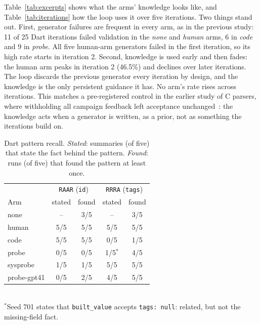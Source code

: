 Table~\ref{tab:excerpts} shows what the arms' knowledge looks like, and
Table~\ref{tab:iterations} how the loop uses it over five iterations. Two
things stand out. First, generator failures are frequent in every arm, as in
the previous study: 11 of 25 Dart iterations failed validation in the
\emph{none} and \emph{human} arms, 6 in \emph{code} and 9 in
\emph{probe}. All five human-arm generators failed in the first iteration,
so its high rate starts in iteration 2. Second, knowledge is used early and
then fades: the human arm peaks in iteration 2 (46.5\%) and declines over later
iterations. The loop discards the
previous generator every iteration by design, and the knowledge is the only
persistent guidance it has. No arm's rate rises across iterations. This matches a
pre-registered control in the earlier study of C parsers, where withholding
all campaign feedback left acceptance unchanged~\grammarcite{}: the
knowledge acts when a generator is written, as a prior, not as something
the iterations build on.

\begin{table}[t]
\centering
\caption{Dart pattern recall. \emph{Stated}: summaries (of five) that state
the fact behind the pattern. \emph{Found}: runs (of five) that found the
pattern at least once.}
\label{tab:recall}
\begin{tabular}{lcccc}
\toprule
& \multicolumn{2}{c}{\texttt{RAAR} (\texttt{id})} & \multicolumn{2}{c}{\texttt{RRRA} (\texttt{tags})} \\
Arm & stated & found & stated & found \\
\midrule
none  & --   & 3/5 & --   & 3/5 \\
human & 5/5  & 5/5 & 5/5  & 5/5 \\
code  & 5/5  & 5/5 & 0/5  & 1/5 \\
probe & 0/5  & 0/5 & 1/5$^{*}$ & 4/5 \\
\midrule
sysprobe    & 1/5 & 1/5 & 5/5 & 5/5 \\
probe-gpt41 & 0/5 & 2/5 & 4/5 & 5/5 \\
\bottomrule
\end{tabular}\\[2pt]
{\footnotesize $^{*}$Seed 701 states that \texttt{built\_value} accepts
\texttt{tags: null}: related, but not the missing-field fact.}
\end{table}

